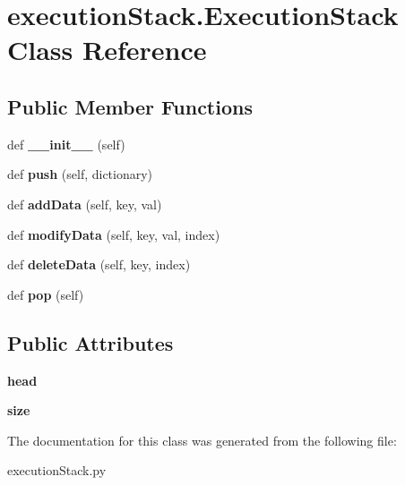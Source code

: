 \hypertarget{classexecution_stack_1_1_execution_stack}{}\section{execution\+Stack.\+Execution\+Stack Class Reference}
\label{classexecution_stack_1_1_execution_stack}
\subsection*{Public Member Functions}
\begin{DoxyCompactItemize}
\item 
\mbox{\label{classexecution_stack_1_1_execution_stack_a955ae5d9778e86b1c0325a0873fad686}} 
def {\bfseries \+\_\+\+\_\+init\+\_\+\+\_\+} (self)
\item 
\mbox{\label{classexecution_stack_1_1_execution_stack_a228350aa77b6029b1aafdcd34612ce61}} 
def {\bfseries push} (self, dictionary)
\item 
\mbox{\label{classexecution_stack_1_1_execution_stack_a7df2cbd7895c11c301631b45d7d24e1b}} 
def {\bfseries add\+Data} (self, key, val)
\item 
\mbox{\label{classexecution_stack_1_1_execution_stack_ab1bcc59b2d0f26c0178f7c457efce474}} 
def {\bfseries modify\+Data} (self, key, val, index)
\item 
\mbox{\label{classexecution_stack_1_1_execution_stack_aaa0f483291031cc81423a4525838f8d0}} 
def {\bfseries delete\+Data} (self, key, index)
\item 
\mbox{\label{classexecution_stack_1_1_execution_stack_aec0e4c8c421162e42668372c1309e6c5}} 
def {\bfseries pop} (self)
\end{DoxyCompactItemize}
\subsection*{Public Attributes}
\begin{DoxyCompactItemize}
\item 
\mbox{\label{classexecution_stack_1_1_execution_stack_ad712e443c44369cb1de23bb4010c89f3}} 
{\bfseries head}
\item 
\mbox{\label{classexecution_stack_1_1_execution_stack_a7011596156e1e3128bb44099347b5db8}} 
{\bfseries size}
\end{DoxyCompactItemize}


The documentation for this class was generated from the following file\+:\begin{DoxyCompactItemize}
\item 
execution\+Stack.\+py\end{DoxyCompactItemize}

